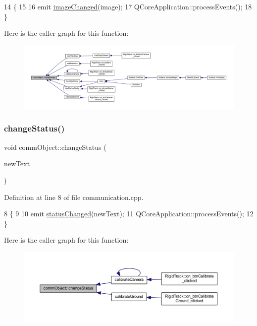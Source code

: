 \begin{DoxyCode}
14                                           \{
15 
16     emit \hyperlink{classcomm_object_a3828eab6be234f6216a6f80a6a82e41e}{imageChanged}(image);
17     QCoreApplication::processEvents();
18 \}
\end{DoxyCode}
Here is the caller graph for this function\+:\nopagebreak
\begin{figure}[H]
\begin{center}
\leavevmode
\includegraphics[width=350pt]{classcomm_object_a6f81522c2aa1668fa402f08710e6206b_icgraph}
\end{center}
\end{figure}
\mbox{\label{classcomm_object_a1f4b8dd22ecc46bab619f6b1fe1a5144}} 
\subsubsection{\texorpdfstring{change\+Status()}{changeStatus()}}
{\footnotesize\ttfamily void comm\+Object\+::change\+Status (\begin{DoxyParamCaption}\item[{Q\+String}]{new\+Text }\end{DoxyParamCaption})}



Definition at line 8 of file communication.\+cpp.


\begin{DoxyCode}
8                                              \{
9 
10     emit \hyperlink{classcomm_object_adccf5b5946d35d5cf6d76f367f93e335}{statusChanged}(newText);
11     QCoreApplication::processEvents();
12 \}
\end{DoxyCode}
Here is the caller graph for this function\+:\nopagebreak
\begin{figure}[H]
\begin{center}
\leavevmode
\includegraphics[width=350pt]{classcomm_object_a1f4b8dd22ecc46bab619f6b1fe1a5144_icgraph}
\end{center}
\end{figure}
\mbox{\label{classcomm_object_a785f776d16f1871786bb88482fc4dd1f}} 
